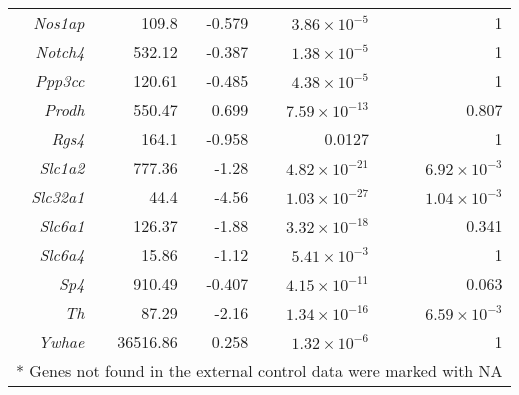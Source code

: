 {\begin{longtable}{rrrrrr}
    \textit{Nos1ap} & 109.8 & -0.579 & $3.86\times 10^{-5}$ &       & 1 \\
    \textit{Notch4} & 532.12 & -0.387 & $1.38\times 10^{-5}$ &       & 1 \\
    \textit{Ppp3cc} & 120.61 & -0.485 & $4.38\times 10^{-5}$ &       & 1 \\
    \textit{Prodh} & 550.47 & 0.699 & $7.59\times 10^{-13}$ &       & 0.807 \\
    \textit{Rgs4} & 164.1 & -0.958 & 0.0127 &       & 1 \\
    \textit{Slc1a2} & 777.36 & -1.28 & $4.82\times 10^{-21}$ &       & $6.92\times 10^{-3}$ \\
    \textit{Slc32a1} & 44.4  & -4.56 & $1.03\times 10^{-27}$ &       & $1.04\times 10^{-3}$ \\
    \textit{Slc6a1} & 126.37 & -1.88 & $3.32\times 10^{-18}$ &       & 0.341 \\
    \textit{Slc6a4} & 15.86 & -1.12 & $5.41\times 10^{-3}$ &       & 1 \\
    \textit{Sp4} & 910.49 & -0.407 & $4.15\times 10^{-11}$ &       & 0.063 \\
    \textit{Th} & 87.29 & -2.16 & $1.34\times 10^{-16}$ &       & $6.59\times 10^{-3}$ \\
    \textit{Ywhae} & 36516.86 & 0.258 & $1.32\times 10^{-6}$ &       & 1 \\
    \bottomrule
    \multicolumn{6}{l}{* Genes not found in the external control data were marked with NA} \\
    
\end{longtable}%
}
